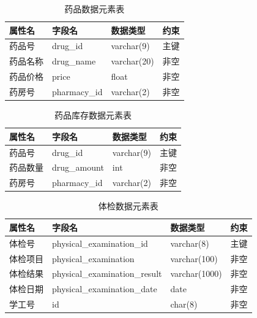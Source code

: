 \documentclass{article}
\begin{document}
\begin{table}[H]
    \centering
    \begin{tabularx}{\textwidth}{|>{\raggedright\arraybackslash}X|>{\raggedright\arraybackslash}X|>{\raggedright\arraybackslash}X|>{\raggedright\arraybackslash}X|}
    \toprule
    \textbf{属性名} & \textbf{字段名} & \textbf{数据类型} & \textbf{约束} \\ \midrule
    药品号 & drug\_id & varchar(9) & 主键 \\ \midrule
    药品名称 & drug\_name & varchar(20) & 非空 \\ \midrule
    药品价格 & price & float & 非空 \\ \midrule
    药房号 & pharmacy\_id & varchar(2) & 非空 \\ \bottomrule
    \end{tabularx}
    \caption{药品数据元素表}
    \label{tab:drug_elements}
\end{table}

\begin{table}[H]
    \centering
    \begin{tabularx}{\textwidth}{|>{\raggedright\arraybackslash}X|>{\raggedright\arraybackslash}X|>{\raggedright\arraybackslash}X|>{\raggedright\arraybackslash}X|}
    \toprule
    \textbf{属性名} & \textbf{字段名} & \textbf{数据类型} & \textbf{约束} \\ \midrule
    药品号 & drug\_id & varchar(9) & 主键 \\ \midrule
    药品数量 & drug\_amount & int & 非空 \\ \midrule
    药房号 & pharmacy\_id & varchar(2) & 非空 \\ \bottomrule
    \end{tabularx}
    \caption{药品库存数据元素表}
    \label{tab:drug_storage_elements}
\end{table}

\begin{table}[H]
    \centering
    \begin{tabularx}{\textwidth}{|>{\raggedright\arraybackslash}X|>{\raggedright\arraybackslash}X|>{\raggedright\arraybackslash}X|>{\raggedright\arraybackslash}X|}
    \toprule
    \textbf{属性名} & \textbf{字段名} & \textbf{数据类型} & \textbf{约束} \\ \midrule
    体检号 & physical\_examination\_id & varchar(8) & 主键 \\ \midrule
    体检项目 & physical\_examination & varchar(100) & 非空 \\ \midrule
    体检结果 & physical\_examination\_result & varchar(1000) & 非空 \\ \midrule
    体检日期 & physical\_examination\_date & date & 非空 \\ \midrule
    学工号 & id & char(8) & 非空 \\ \bottomrule
    \end{tabularx}
    \caption{体检数据元素表}
    \label{tab:physical_examination_elements}
\end{table}
\end{document}
